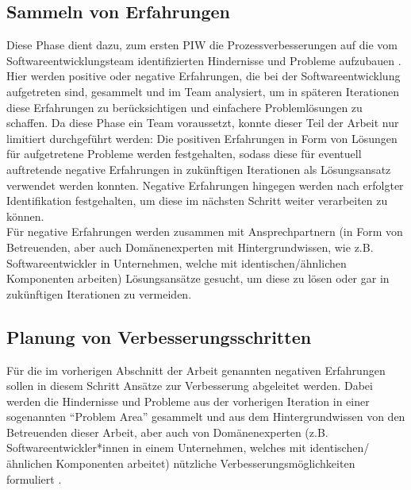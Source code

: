 \subsection{Sammeln von Erfahrungen}
Diese Phase dient dazu, zum ersten PIW die Prozessverbesserungen auf die vom Softwareentwicklungsteam identifizierten Hindernisse und Probleme aufzubauen \cite{salo2007iterative}. Hier werden positive oder negative Erfahrungen, die bei der Softwareentwicklung aufgetreten sind, gesammelt und im Team analysiert, um in späteren Iterationen diese Erfahrungen zu berücksichtigen und einfachere Problemlösungen zu schaffen. Da diese Phase ein Team voraussetzt, konnte dieser Teil der Arbeit nur limitiert durchgeführt werden: Die positiven Erfahrungen in Form von Lösungen für aufgetretene Probleme werden festgehalten, sodass diese für eventuell auftretende negative Erfahrungen in zukünftigen Iterationen als Lösungsansatz verwendet werden konnten. Negative Erfahrungen hingegen werden nach erfolgter Identifikation festgehalten, um diese im nächsten Schritt weiter verarbeiten zu können. \\
Für negative Erfahrungen werden zusammen mit Ansprechpartnern (in Form von Betreuenden, aber auch Domänenexperten mit Hintergrundwissen, wie z.B. Softwareentwickler in Unternehmen, welche mit identischen/ähnlichen Komponenten arbeiten) Lösungsansätze gesucht, um diese zu lösen oder gar in zukünftigen Iterationen zu vermeiden.

\subsection{Planung von Verbesserungsschritten}
Für die im vorherigen Abschnitt der Arbeit genannten negativen Erfahrungen sollen in diesem Schritt Ansätze zur Verbesserung abgeleitet werden. Dabei werden die Hindernisse und Probleme aus der vorherigen Iteration in einer sogenannten \enquote{Problem Area} gesammelt und aus dem Hintergrundwissen von den Betreuenden dieser Arbeit, aber auch von Domänenexperten (z.B. Softwareentwickler*innen in einem Unternehmen, welches mit identischen/ähnlichen Komponenten arbeitet) nützliche Verbesserungsmöglichkeiten formuliert \cite{salo2007iterative}. 

